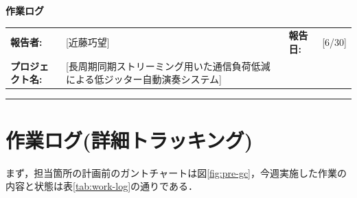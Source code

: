 \documentclass[10pt]{ltjsarticle} %
\begin{document}
\setlength{\extrarowheight}{2pt}

\begin{center}
    {\huge\bfseries 作業ログ}
\end{center}
\vspace{10mm}

\noindent
\begin{tabularx}{\textwidth}{lX lX}
    \textbf{報告者:} & [近藤巧望] & \textbf{報告日:} & [6/30] \\
    \textbf{プロジェクト名:} & [長周期同期ストリーミング用いた通信負荷低減による低ジッター自動演奏システム] & & \\
\end{tabularx}

\vspace{5mm}
\hrule
\vspace{5mm}

\section{作業ログ(詳細トラッキング)}
まず，担当箇所の計画前のガントチャートは図\ref{fig:pre-gc}，今週実施した作業の内容と状態は表\ref{tab:work-log}の通りである．
\end{document}

